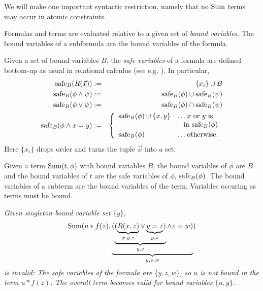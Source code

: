 We will make one important syntactic restriction, namely that
no $\mbox{Sum}$ terms may occur in atomic constraints.

Formulas and terms are evaluated relative to a given set of
{\em bound variables}.
The bound variables of a subformula are the bound variables of the formula.

Given a set of bound variables $B$,
the {\em safe variables} of a formula are defined bottom-up
as usual in relational
calculus (see e.g. \cite{DBLP:books/aw/AbiteboulHV95}). In particular,
\begin{eqnarray*}
\mbox{safe}_B(R(\vec{x})) &:=& \{x_i\} \cup B \\
\mbox{safe}_B(\phi \land \psi) &:=& \mbox{safe}_B(\phi) \cup \mbox{safe}_B(\psi) \\
\mbox{safe}_B(\phi \lor \psi)  &:=& \mbox{safe}_B(\phi) \cap \mbox{safe}_B(\psi) \\
\mbox{safe}_B(\phi \land x = y) &:=&
\left\{\begin{array}{ll}
\mbox{safe}_B(\phi) \cup \{ x, y \} &\dots
\mbox{$x$ or $y$ is} \\
&\;\;\; \mbox{in $\mbox{safe}_B(\phi)$} \\[.5ex]
\mbox{safe}_B(\phi) &\dots \mbox{otherwise}.
\end{array} \right.
\end{eqnarray*}
Here $\{x_i\}$ drops order and turns the tuple $\vec{x}$ into a set.

Given a term $\mbox{Sum}(t, \phi)$ with bound variables $B$,
the bound variables of $\phi$ are $B$ and the bound variables of $t$ are
the safe variables of $\phi$, $\mbox{safe}_B(\phi)$.
The bound variables of a subterm are the bound variables of the term.
Variables occuring as terms must be bound.

\begin{example}\em
Given singleton bound variable set $\{ y \}$,
\[ \mbox{Sum}(u * f(z), \underbrace{(\underbrace{(\underbrace{R(x, z)}_{x,y,z} \lor \underbrace{y=z}_{y,z})}_{y,z} \land z = w)}_{y,z,w}) \]
is invalid: The safe variables of the formula are
$\{y,z,w\}$, so $u$ is not bound in the term $u * f(z)$. The overall term
becomes valid for bound variables $\{u,y\}$.
\punto
\end{example}


\def\db{{\cal{A}}}

